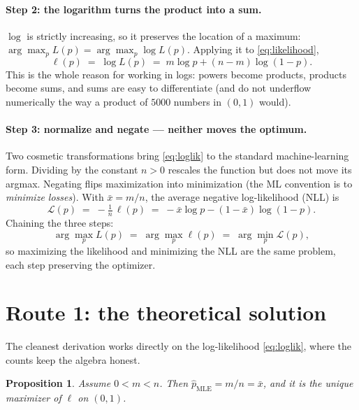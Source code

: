 \documentclass[11pt]{article}
\newtheorem{proposition}{Proposition}
\newcommand{\xbar}{\bar{x}}
\begin{document}
\paragraph{Step 2: the logarithm turns the product into a sum.}
$\log$ is strictly increasing, so it preserves the location of a maximum:
$\arg\max_p L(p) = \arg\max_p \log L(p)$. Applying it to
\eqref{eq:likelihood},
\begin{equation}
  \ell(p) \;=\; \log L(p) \;=\; m\log p + (n-m)\log(1-p).
  \label{eq:loglik}
\end{equation}
This is the whole reason for working in logs: powers become products,
products become sums, and sums are easy to differentiate (and do not
underflow numerically the way a product of $5000$ numbers in $(0,1)$
would).

\paragraph{Step 3: normalize and negate --- neither moves the optimum.}
Two cosmetic transformations bring \eqref{eq:loglik} to the standard
machine-learning form. Dividing by the constant $n > 0$ rescales the
function but does not move its argmax. Negating flips maximization into
minimization (the ML convention is to \emph{minimize losses}). With
$\xbar = m/n$, the average negative log-likelihood (NLL) is
\begin{equation}
  \mathcal{L}(p) \;=\; -\tfrac1n\,\ell(p)
  \;=\; -\xbar\log p - (1-\xbar)\log(1-p).
  \label{eq:nll}
\end{equation}
Chaining the three steps:
\begin{equation}
  \arg\max_p L(p)
  \;=\; \arg\max_p \ell(p)
  \;=\; \arg\min_p \mathcal{L}(p),
  \label{eq:equiv}
\end{equation}
so maximizing the likelihood and minimizing the NLL are the same problem,
each step preserving the optimizer.

\section{Route 1: the theoretical solution}

The cleanest derivation works directly on the log-likelihood
\eqref{eq:loglik}, where the counts keep the algebra honest.

\begin{proposition}
Assume $0 < m < n$. Then $\hat{p}_{\mathrm{MLE}} = m/n = \xbar$, and it is
the unique maximizer of $\ell$ on $(0,1)$.
\end{proposition}
\end{document}
